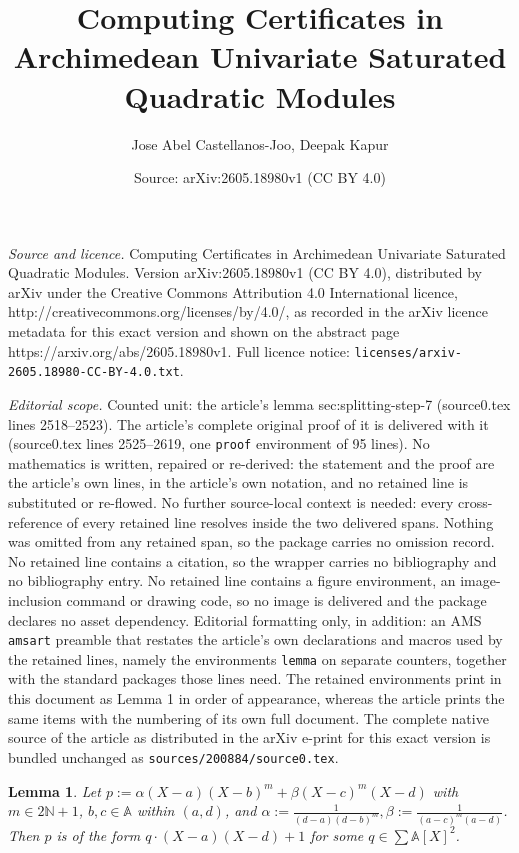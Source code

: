\documentclass[10pt,a4paper]{amsart}
\title{Computing Certificates in Archimedean Univariate Saturated Quadratic Modules}
\author{Jose Abel Castellanos-Joo, Deepak Kapur}
\date{Source: arXiv:2605.18980v1 (CC BY 4.0)}
\newtheorem{lemma}{Lemma}
\newcommand{\aX}{\mathbb{A}[X]}
\begin{document}
\maketitle

\noindent\emph{Source and licence.} Computing Certificates in Archimedean Univariate Saturated Quadratic Modules. Version arXiv:2605.18980v1 (CC BY 4.0), distributed by arXiv under the Creative Commons Attribution 4.0 International licence, http://creativecommons.org/licenses/by/4.0/, as recorded in the arXiv licence metadata for this exact version and shown on the abstract page https://arxiv.org/abs/2605.18980v1. Full licence notice: \texttt{licenses/arxiv-2605.18980-CC-BY-4.0.txt}.\par\smallskip

\noindent\textit{Editorial scope.} Counted unit: the article's lemma sec:splitting-step-7 (source0.tex lines 2518--2523). The article's complete original proof of it is delivered with it (source0.tex lines 2525--2619, one \texttt{proof} environment of 95 lines). No mathematics is written, repaired or re-derived: the statement and the proof are the article's own lines, in the article's own notation, and no retained line is substituted or re-flowed.  No further source-local context is needed: every cross-reference of every retained line resolves inside the two delivered spans.  Nothing was omitted from any retained span, so the package carries no omission record.  No retained line contains a citation, so the wrapper carries no bibliography and no bibliography entry.  No retained line contains a figure environment, an image-inclusion command or drawing code, so no image is delivered and the package declares no asset dependency.  Editorial formatting only, in addition: an AMS \texttt{amsart} preamble that restates the article's own declarations and macros used by the retained lines, namely the environments \texttt{lemma} on separate counters, together with the standard packages those lines need.  The retained environments print in this document as Lemma 1 in order of appearance, whereas the article prints the same items with the numbering of its own full document.  The complete native source of the article as distributed in the arXiv e-print for this exact version is bundled unchanged as \texttt{sources/200884/source0.tex}.
\begin{lemma} \th\label{sec:splitting-step-7} Let
  $p := \alpha(X-a)(X-b)^{m} + \beta(X-c)^{m}(X-d)$ with
  $m \in 2\mathbb{N} + 1$, $b, c \in \mathbb{A}$ within $(a, d)$, and
  $\alpha := \frac{1}{(d-a)(d-b)^{m}}, \beta := \frac{1}{(a-c)^{m}(a-d)}$. Then
  $p$ is of the form $q \cdot (X-a)(X-d) + 1$ for some $q \in \sum{\aX}^2$.
\end{lemma}
\end{document}
